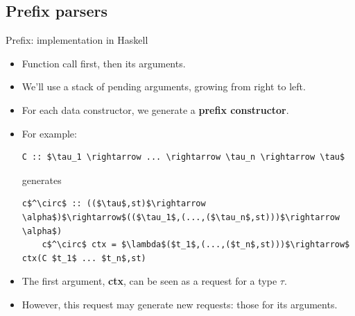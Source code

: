 \documentclass[10pt]{beamer}
\begin{document}
\subsection{Prefix parsers}

\begin{frame}[fragile]{Prefix: implementation in Haskell}

\begin{itemize}

\item Function call first, then its arguments.
\item We'll use a stack of pending arguments, growing from right to left.
\item For each data constructor, we generate a \textbf{prefix constructor}.

\item For example:
\begin{lstlisting}[mathescape=true]
	C :: $\tau_1 \rightarrow ... \rightarrow \tau_n \rightarrow \tau$
\end{lstlisting}
generates
\begin{lstlisting}[mathescape=true, escapechar=!]
	c$^\circ$ :: (($\tau$,st)$\rightarrow \alpha$)$\rightarrow$(($\tau_1$,(...,($\tau_n$,st)))$\rightarrow \alpha$)
	c$^\circ$ ctx = $\lambda$($t_1$,(...,($t_n$,st)))$\rightarrow$ ctx(C $t_1$ ... $t_n$,st)
\end{lstlisting}

\item The first argument, \textbf{ctx}, can be seen as a request for a type $\tau$.
\item However, this request may generate new requests: those for its arguments.

\end{itemize}

\end{frame}
\end{document}
